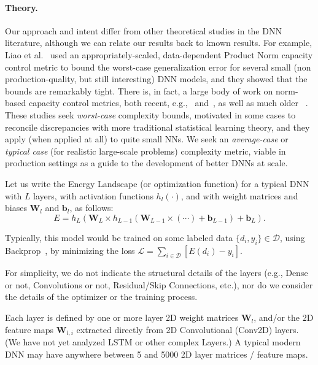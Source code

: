 \paragraph{Theory.} 
Our approach and intent differ from other theoretical studies in the DNN literature, although we can relate our results back to known results.
For example, Liao et al.~\cite{LMBx18_TR} used an appropriately-scaled, data-dependent Product Norm capacity control metric to bound the worst-case generalization 
error for several small (non production-quality, but still interesting) DNN models, and they showed that the bounds are remarkably tight.
There is, in fact, a large body of work on norm-based capacity control metrics, both recent, e.g.,~\cite{LMBx18_TR, SHNx17_TR,PLMx18_TR} and~\cite{NTS14_TR,NTS15,NBMS17_TR,BFT17_TR,YM17_TR,KKB17_TR,NBS17_TR,AGNZ18_TR,ACH18_TR,ZF18_TR}, as well as much older ~\cite{Bar97,MN09_TR}. 
These studies seek \emph{worst-case} complexity bounds, motivated in some cases to reconcile discrepancies with more traditional statistical learning theory, and they apply (when applied at all) to quite small NNs.
We seek an \emph{average-case} or \emph{typical case} (for realistic large-scale problems) complexity metric, viable in production settings as a guide to the development of better DNNs at scale.

Let us write the Energy Landscape (or optimization function) for a typical DNN with $L$ layers, with activation functions $h_{l}(\cdot)$, and with weight matrices and 
biases $\mathbf{W}_{l}$ and $\mathbf{b}_{l}$, as follows:
\begin{equation}
E=h_{L}(\mathbf{W}_{L}\times h_{L-1}(\mathbf{W}_{L-1}\times(\cdots)+\mathbf{b}_{L-1})+\mathbf{b}_{L})  .
\label{eqn:dnn_energy}
\end{equation}

Typically, this model would be trained on some labeled data $\{d_{i},y_{i}\}\in\mathcal{D}$, using Backprop~\cite{LBOM12_tricks}, by minimizing the loss $\mathcal{L}=\sum_{i\in\mathcal{D}}[E(d_{i})-y_{i}]$.

For simplicity, we do not indicate the structural details of the layers (e.g., Dense or not, Convolutions or not, Residual/Skip Connections, etc.), nor do we consider the details of the optimizer or the training process.

Each layer is defined by one or more layer 2D weight matrices $\mathbf{W}_{l}$, and/or the 2D feature maps $\mathbf{W}_{l,i}$ extracted directly from 2D Convolutional (Conv2D) layers.
(We have not yet analyzed LSTM or other complex Layers.)   A typical modern DNN may have anywhere between 5 and 5000 2D layer matrices / feature maps.

